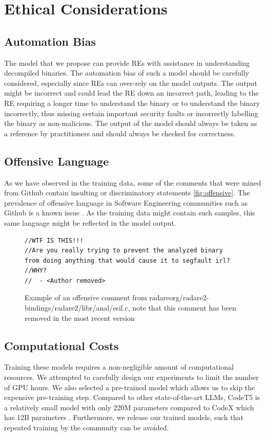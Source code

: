 \section{Ethical Considerations}
\subsection{Automation Bias}
The model that we propose can provide REs with assistance in understanding decompiled binaries. The automation bias of such a model should be carefully considered, especially since REs can over-rely on the model outputs. The output might be incorrect and could lead the RE down an incorrect path, leading to the RE requiring a longer time to understand the binary or to understand the binary incorrectly, thus missing certain important security faults or incorrectly labelling the binary as non-malicious. The output of the model should always be taken as a reference by practitioners and should always be checked for correctness.

\subsection{Offensive Language}
As we have observed in the training data, some of the comments that were mined from Github contain insulting or discriminatory statements \ref{fig:offensive}. The prevalence of offensive language in Software Engineering communities such as Github is a known issue \cite{OffensiveLanguage}. As the training data might contain such samples, this same language might be reflected in the model output. 
\label{fig:offensive}
\begin{figure}[H]
  \centering
\begin{lstlisting}
//WTF IS THIS!!!
//Are you really trying to prevent the analyzed binary 
from doing anything that would cause it to segfault irl?
//WHY?
//	- <Author removed>
\end{lstlisting}
  \caption{Example of an offensive comment from radareorg/radare2-bindings/radare2/libr/anal/esil.c, note that this comment has been removed in the most recent version}
\end{figure}


\subsection{Computational Costs}
Training these models requires a non-negligible amount of computational resources. We attempted to carefully design our experiments to limit the number of GPU hours. We also selected a pre-trained model which allows us to skip the expensive pre-training step. Compared to other state-of-the-art LLMs, CodeT5 is a relatively small model with only 220M parameters compared to CodeX which has 12B parameters \cite{CodeX}. Furthermore, we release our trained models, such that repeated training by the community can be avoided.

